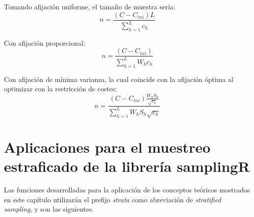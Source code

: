 Tomando afijación uniforme, el tamaño de muestra sería:\\

\begin{equation}
    n = \frac{(C-C_{ini})L}{\sum\limits_{h=1}^Lc_h}
\end{equation}

Con afijación proporcional:\\

\begin{equation}
    n = \frac{(C-C_{ini})}{\sum\limits_{h=1}^LW_hc_h}
\end{equation}

Con afijación de mínima varianza, la cual coincide con la afijación óptima al optimizar con la restricción de costes:\\

\begin{equation}
    n = \frac{(C-C_{ini})\frac{W_hS_h}{\sqrt{c_h}}}{\sum\limits_{h=1}^LW_hS_h\sqrt{c_h}}
\end{equation}


\section{Aplicaciones para el muestreo estraficado de la librería samplingR}

Las funciones desarrolladas para la aplicación de los conceptos teóricos mostrados en este capítulo utilizarán el prefijo \textit{strata} como abreviación de \textit{stratified sampling}, y son las siguientes.


